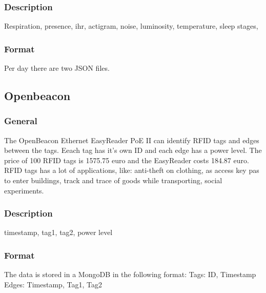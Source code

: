 			\subsubsection{Description}
				Respiration, presence, ihr, actigram, noise, luminosity, temperature, sleep stages, 
			\subsubsection{Format}
			Per day there are two JSON files.
			\lstset { 
				basicstyle = \footnotesize,
				tabsize = 2
			}
			
			


	\subsection{Openbeacon}
		\subsubsection{General}
			The OpenBeacon Ethernet EasyReader PoE II can identify RFID tags and edges between the tags. Eeach tag has it's own ID and each edge has a power level. The price of 100 RFID tags is 1575.75 euro and the EasyReader costs 184.87 euro. RFID tags has a lot of applications, like: anti-theft on clothing, as access key pas to enter buildings, track and trace of goods while transporting, social experiments.
		\subsubsection{Description}
		timestamp, tag1, tag2, power level

		\subsubsection{Format}
		The data is stored in a MongoDB in the following format:
		Tags: ID, Timestamp
		Edges: Timestamp, Tag1, Tag2
